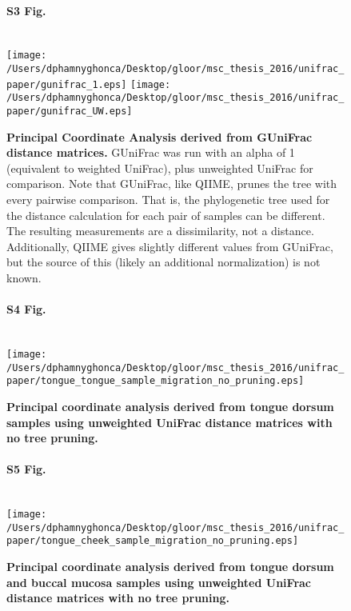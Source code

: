 \documentclass[10pt,letterpaper]{article}
\begin{document}
\begin{figure}[h]
\paragraph*{S3 Fig.}\mbox{}\\
\texttt{[image: /Users/dphamnyghonca/Desktop/gloor/msc\_thesis\_2016/unifrac\_paper/gunifrac\_1.eps]}
\texttt{[image: /Users/dphamnyghonca/Desktop/gloor/msc\_thesis\_2016/unifrac\_paper/gunifrac\_UW.eps]}
\caption[Principal Coordinate Analysis derived from GUniFrac distance matrices.]{{\bf Principal Coordinate Analysis derived from GUniFrac distance matrices. } GUniFrac was run with an alpha of 1 (equivalent to weighted UniFrac), plus unweighted UniFrac for comparison. Note that GUniFrac, like QIIME, prunes the tree with every pairwise comparison. That is, the phylogenetic tree used for the distance calculation for each pair of samples can be different. The resulting measurements are a dissimilarity, not a distance. Additionally, QIIME gives slightly different values from GUniFrac, but the source of this (likely an additional normalization) is not known.}
\label{gunifrac_3}
\end{figure}

\begin{figure}[h]
\paragraph*{S4 Fig.}\mbox{}\\
\texttt{[image: /Users/dphamnyghonca/Desktop/gloor/msc\_thesis\_2016/unifrac\_paper/tongue\_tongue\_sample\_migration\_no\_pruning.eps]}
\caption[Principal coordinate analysis derived from tongue dorsum samples using unweighted UniFrac distance matrices with no tree pruning.]{{\bf Principal coordinate analysis derived from tongue dorsum samples using unweighted UniFrac distance matrices with no tree pruning.}}
\label{S2_Fig}
\end{figure}

\begin{figure}[h]
\paragraph*{S5 Fig.}\mbox{}\\
\texttt{[image: /Users/dphamnyghonca/Desktop/gloor/msc\_thesis\_2016/unifrac\_paper/tongue\_cheek\_sample\_migration\_no\_pruning.eps]}
\caption[Principal coordinate analysis derived from tongue dorsum and buccal mucosa samples using unweighted UniFrac distance matrices with no tree pruning.]{{\bf Principal coordinate analysis derived from tongue dorsum and buccal mucosa samples using unweighted UniFrac distance matrices with no tree pruning.}}
\label{S3_Fig}
\end{figure}
\end{document}
